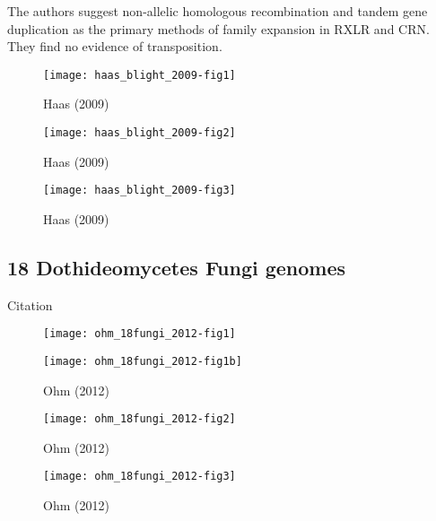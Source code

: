   The authors suggest non-allelic homologous recombination and tandem gene
  duplication as the primary methods of family expansion in RXLR and CRN.  They
  find no evidence of transposition.

  \begin{figure}[!hbpt]
    \centering
    \texttt{[image: haas\_blight\_2009-fig1]}
    \caption{
        Haas (2009) \cite{haas_genome_2009}
    }
  \end{figure}

  \begin{figure}[!hbpt]
    \centering
    \texttt{[image: haas\_blight\_2009-fig2]}
    \caption{
        Haas (2009) \cite{haas_genome_2009}
    }
  \end{figure}

  \begin{figure}[!hbpt]
    \centering
    \texttt{[image: haas\_blight\_2009-fig3]}
    \caption{
        Haas (2009) \cite{haas_genome_2009}
    }
  \end{figure}

  \FloatBarrier

\subsection{18 Dothideomycetes Fungi genomes}

  Citation \cite{ohm_diverse_2012}

  \begin{figure}[!hbpt] \centering
    \texttt{[image: ohm\_18fungi\_2012-fig1]}
  \end{figure}

  \begin{figure}[!hbpt] \centering
    \texttt{[image: ohm\_18fungi\_2012-fig1b]}
    \caption{Ohm (2012) \cite{ohm_diverse_2012}}
  \end{figure}

  \begin{figure}[!hbpt] \centering
    \texttt{[image: ohm\_18fungi\_2012-fig2]}
    \caption{Ohm (2012) \cite{ohm_diverse_2012}}
  \end{figure}

  \begin{figure}[!hbpt] \centering
    \texttt{[image: ohm\_18fungi\_2012-fig3]}
    \caption{Ohm (2012) \cite{ohm_diverse_2012}}
  \end{figure}

